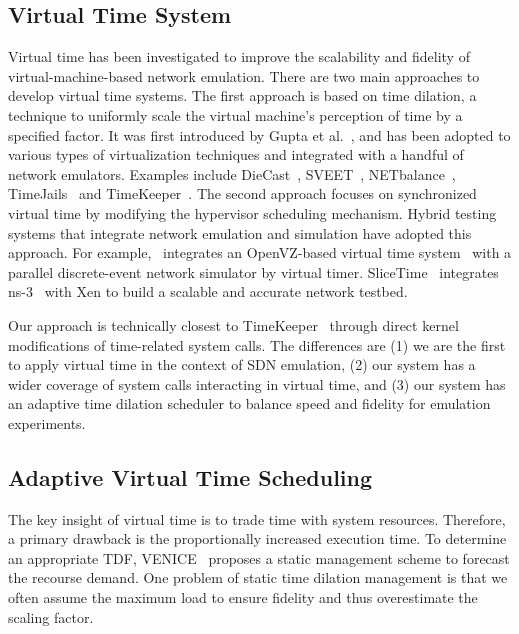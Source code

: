 
\subsection{Virtual Time System}
Virtual time has been investigated to improve the scalability and fidelity of virtual-machine-based network emulation. 
There are two main approaches to develop virtual time systems.
The first approach is based on time dilation, a technique to uniformly scale the virtual machine's perception of time by a specified factor. 
It was first introduced by Gupta et al.~\cite{ToInfinityBeyond},
and has been adopted to various types of virtualization techniques and integrated with a handful of network emulators. 
Examples include DieCast~\cite{DieCast}, SVEET~\cite{SVEET}, NETbalance~\cite{NETbalance}, TimeJails~\cite{ComparisonVR-VM, TimeJails} and TimeKeeper~\cite{TimeKeeper}. 
The second approach focuses on synchronized virtual time by modifying the hypervisor scheduling mechanism. 
Hybrid testing systems that integrate network emulation and simulation have adopted this approach. 
For example,~\cite{jin2012virtual} integrates an OpenVZ-based virtual time system~\cite{VirtTimeOpenVZ} with
a parallel discrete-event network simulator by virtual timer.
SliceTime~\cite{SliceTime} integrates ns-3~\cite{NS-3} with Xen to build a scalable and accurate network testbed.

Our approach is technically closest to TimeKeeper~\cite{TimeKeeper} through direct kernel modifications of time-related system calls. 
The differences are (1) we are the first to apply virtual time in the context of SDN emulation,
(2) our system has a wider coverage of system calls interacting in virtual time,
and (3) our system has an adaptive time dilation scheduler to balance speed and fidelity for emulation experiments.

\subsection{Adaptive Virtual Time Scheduling}
The key insight of virtual time is to trade time with system resources. 
Therefore, a primary drawback is the proportionally increased execution time.
To determine an appropriate TDF, VENICE~\cite{VirtualTimeMachine} proposes a static management scheme to forecast the recourse demand. 
One problem of static time dilation management is that we often assume the maximum load to ensure fidelity and thus overestimate the scaling factor. 

